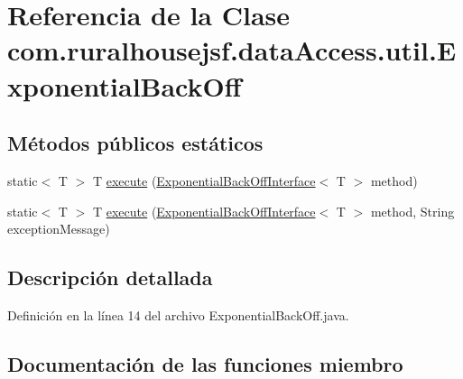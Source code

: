 \hypertarget{classcom_1_1ruralhousejsf_1_1data_access_1_1util_1_1_exponential_back_off}{}\section{Referencia de la Clase com.\+ruralhousejsf.\+data\+Access.\+util.\+Exponential\+Back\+Off}
\label{classcom_1_1ruralhousejsf_1_1data_access_1_1util_1_1_exponential_back_off}
\subsection*{Métodos públicos estáticos}
\begin{DoxyCompactItemize}
\item 
static$<$ T $>$ T \mbox{\hyperlink{classcom_1_1ruralhousejsf_1_1data_access_1_1util_1_1_exponential_back_off_a7c14ce7a46732baa58e3b0bf06455a9b}{execute}} (\mbox{\hyperlink{interfacecom_1_1ruralhousejsf_1_1data_access_1_1util_1_1_exponential_back_off_interface}{Exponential\+Back\+Off\+Interface}}$<$ T $>$ method)
\item 
static$<$ T $>$ T \mbox{\hyperlink{classcom_1_1ruralhousejsf_1_1data_access_1_1util_1_1_exponential_back_off_a67faf7d5bf9a822979a6531ffc86a60d}{execute}} (\mbox{\hyperlink{interfacecom_1_1ruralhousejsf_1_1data_access_1_1util_1_1_exponential_back_off_interface}{Exponential\+Back\+Off\+Interface}}$<$ T $>$ method, String exception\+Message)
\end{DoxyCompactItemize}


\subsection{Descripción detallada}


Definición en la línea 14 del archivo Exponential\+Back\+Off.\+java.



\subsection{Documentación de las funciones miembro}
\mbox{\label{classcom_1_1ruralhousejsf_1_1data_access_1_1util_1_1_exponential_back_off_a7c14ce7a46732baa58e3b0bf06455a9b}} 
